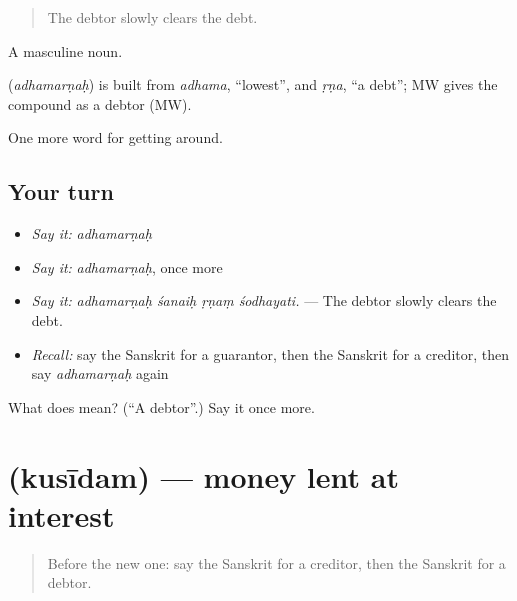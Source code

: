 \begin{quote}
The debtor slowly clears the debt.
\end{quote}

A masculine noun.

\begin{cousinweb}
\textbf{} (\emph{adhamarṇaḥ}) is built from \emph{adhama}, \textquotedblleft{}lowest\textquotedblright{}, and \emph{ṛṇa}, \textquotedblleft{}a debt\textquotedblright{}; MW gives the compound as a debtor (MW).
\end{cousinweb}

\begin{grammarlens}[title={What you've built}]
One more word for getting around.
\end{grammarlens}

\subsection*{Your turn}
\begin{itemize}
\raggedright
  \item \emph{Say it:} \emph{adhamarṇaḥ}
  \item \emph{Say it:} \emph{adhamarṇaḥ}, once more
  \item \emph{Say it:} \emph{adhamarṇaḥ śanaiḥ ṛṇaṃ śodhayati.} — The debtor slowly clears the debt.
  \item \emph{Recall:} say the Sanskrit for a guarantor, then the Sanskrit for a creditor, then say \emph{adhamarṇaḥ} again
\end{itemize}

\begin{tcolorbox}[breakable,colback=teal!4,colframe=teal!35!black,title={Before you move on}]
What does  mean? (\textquotedblleft{}A debtor\textquotedblright{}.) Say it once more.
\end{tcolorbox}
\section[\texorpdfstring{\sk{कुसीदम्} (kusīdam)}{कुसीदम् (kusīdam)}]{ (kusīdam) — money lent at interest}

\label{lesson:SA-C434-kusidam}



\begin{quote}
Before the new one: say the Sanskrit for a creditor, then the Sanskrit for a debtor.
\end{quote}

